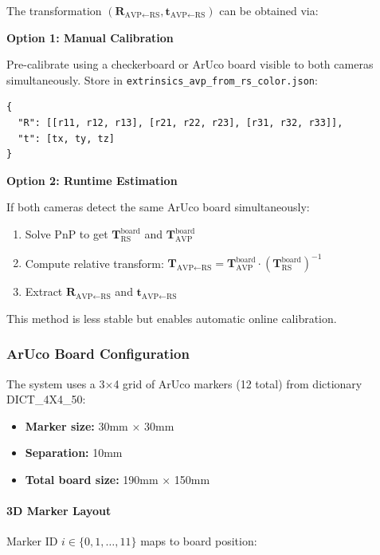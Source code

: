 The transformation $(\mathbf{R}_{\text{AVP←RS}}, \mathbf{t}_{\text{AVP←RS}})$ can be obtained via:

\textbf{Option 1: Manual Calibration}

Pre-calibrate using a checkerboard or ArUco board visible to both cameras simultaneously. Store in \texttt{extrinsics\_avp\_from\_rs\_color.json}:

\begin{verbatim}
{
  "R": [[r11, r12, r13], [r21, r22, r23], [r31, r32, r33]],
  "t": [tx, ty, tz]
}
\end{verbatim}

\textbf{Option 2: Runtime Estimation}

If both cameras detect the same ArUco board simultaneously:
\begin{enumerate}
    \item Solve PnP to get $\mathbf{T}_{\text{RS}}^{\text{board}}$ and $\mathbf{T}_{\text{AVP}}^{\text{board}}$
    \item Compute relative transform: $\mathbf{T}_{\text{AVP←RS}} = \mathbf{T}_{\text{AVP}}^{\text{board}} \cdot (\mathbf{T}_{\text{RS}}^{\text{board}})^{-1}$
    \item Extract $\mathbf{R}_{\text{AVP←RS}}$ and $\mathbf{t}_{\text{AVP←RS}}$
\end{enumerate}

This method is less stable but enables automatic online calibration.

\subsubsection{ArUco Board Configuration}

The system uses a 3×4 grid of ArUco markers (12 total) from dictionary DICT\_4X4\_50:

\begin{itemize}
    \item \textbf{Marker size:} 30mm × 30mm
    \item \textbf{Separation:} 10mm
    \item \textbf{Total board size:} 190mm × 150mm
\end{itemize}

\paragraph{3D Marker Layout}

Marker ID $i \in \{0, 1, \ldots, 11\}$ maps to board position:

